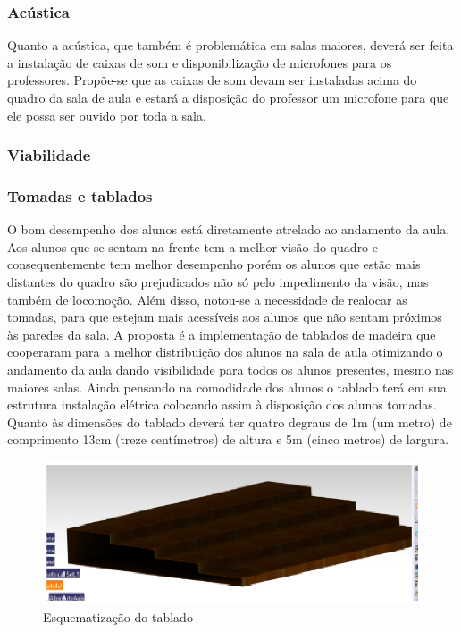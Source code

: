 \subsubsection{Acústica}
Quanto a acústica, que também é problemática em salas maiores, deverá ser feita a instalação de caixas de som e disponibilização de microfones para os professores. Propõe-se que as caixas de som devam ser instaladas acima do quadro da sala de aula e estará a disposição do professor um microfone para que ele possa ser ouvido por toda a sala.

\subsubsection{Viabilidade}

\subsubsection{Tomadas e tablados}
O bom desempenho dos alunos está diretamente atrelado ao andamento da aula. Aos alunos que se sentam na frente tem a melhor visão do quadro e consequentemente tem melhor desempenho porém os alunos que estão mais distantes do quadro são prejudicados não só pelo impedimento da visão, mas também de locomoção. Além disso, notou-se a necessidade de realocar as tomadas, para que estejam mais acessíveis aos alunos que não sentam próximos às paredes da sala.
A proposta é a implementação de tablados de madeira que cooperaram para a melhor distribuição dos alunos na sala de aula otimizando o andamento da aula dando visibilidade para todos os alunos presentes, mesmo nas maiores salas. Ainda pensando na comodidade dos alunos o tablado terá em sua estrutura instalação elétrica colocando assim à disposição dos alunos tomadas.
Quanto às dimensões do tablado deverá ter quatro degraus de 1m (um metro) de comprimento 13cm (treze centímetros) de altura e 5m (cinco metros) de largura. 

\begin{figure}[!h]
\centering
\includegraphics[keepaspectratio=true,scale=1]{figuras/Tablado.eps}
\caption{Esquematização do tablado}
\end{figure}

